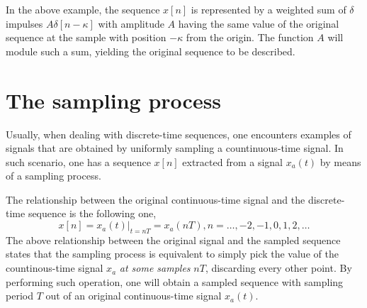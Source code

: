 \documentclass[\documentfontsize, twocolumn]{\classname}
\begin{document}
\begin{center}
\end{center}

In the above example, the se\-quen\-ce $x[n]$ is represented by a weighted sum of $\delta$ impulses $A\delta[n-\kappa]$ with amplitude $A$ having the same value of the original se\-quen\-ce at the sample with position $-\kappa$ from the origin. The function $A$ will module such a sum, yielding the original sequence to be described.


\section{The sampling process}

Usually, when dealing with discrete-time se\-quen\-ces, one encounters examples of signals that are obtained by uniformly sampling a countinuous-time signal. In such scenario, one has a se\-quen\-ce $x[n]$ extracted from a signal $x_a(t)$ by means of a sampling process.

The relationship between the original con\-ti\-nuo\-us-time signal and the discrete-time se\-quen\-ce is the following one,
\[
    x[n] = x_a(t)\Bigr\rvert_{t=nT} = x_a(nT), n = \dots,-2,-1,0,1,2,\dots
\]
The above relationship between the original signal and the sampled se\-quen\-ce states that the sampling process is equivalent to simply pick the value of the countinous-time signal $x_a$ \emph{at some samples} $nT$, discarding every other point. By performing such operation, one will obtain a sampled se\-quen\-ce with sampling period $T$ out of an original continuous-time signal $x_a(t)$.
\end{document}
